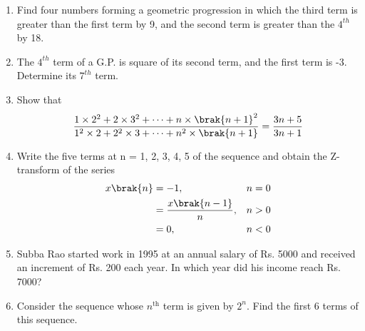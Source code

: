 \begin{enumerate}[label=\thesection.\arabic*,ref=\thesection.\theenumi]

\item  
Find four numbers forming a geometric progression in which the third term is greater than the first term by 9, and the second term is greater than the $4^{th}$ by 18.\\
\solution

\pagebreak

\item The $4^{th}$ term of a G.P. is square of its second term, and the first term is -3. Determine its $7^{th}$ term.\\  

\solution 


\pagebreak

\item Show that
\begin{equation}
    \frac{1\times2^2 + 2\times3^2 + \dots + n\times\brak{n+1}^2}{1^2\times2 + 2^2\times3 +\dots + n^2\times\brak{n+1}}  = \frac{3n+5}{3n+1}\notag
\end{equation}

\solution 


\pagebreak

\item Write the five terms at n = 1, 2, 3, 4, 5 of the sequence and obtain the Z-transform of the series
\begin{align}
    x \brak{n} &=  -1, & n = 0 \\
    &=   \frac{x \brak{n-1}}{n}, & n > 0\\
    &=   0, & n < 0 
\end{align}

\solution


\pagebreak


\item Subba Rao started work in 1995 at an annual salary of Rs. 5000 and received an increment of Rs. 200 each year. In which year did his income reach Rs. 7000?

\solution



\item Consider the sequence whose $n^\text{th}$ term is given by \(2^n\). Find the first 6 terms of this sequence.

\solution


\end{enumerate}
